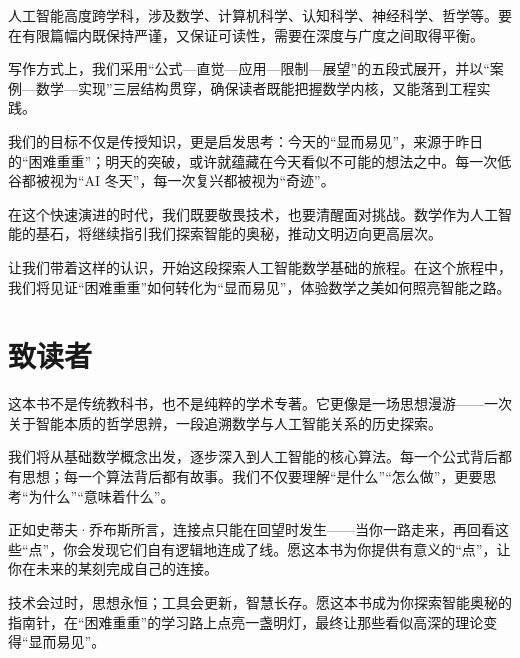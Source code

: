 人工智能高度跨学科，涉及数学、计算机科学、认知科学、神经科学、哲学等。要在有限篇幅内既保持严谨，又保证可读性，需要在深度与广度之间取得平衡。

写作方式上，我们采用“公式—直觉—应用—限制—展望”的五段式展开，并以“案例—数学—实现”三层结构贯穿，确保读者既能把握数学内核，又能落到工程实践。

我们的目标不仅是传授知识，更是启发思考：今天的“显而易见”，来源于昨日的“困难重重”；明天的突破，或许就蕴藏在今天看似不可能的想法之中。每一次低谷都被视为“AI 冬天”，每一次复兴都被视为“奇迹”。

在这个快速演进的时代，我们既要敬畏技术，也要清醒面对挑战。数学作为人工智能的基石，将继续指引我们探索智能的奥秘，推动文明迈向更高层次。

让我们带着这样的认识，开始这段探索人工智能数学基础的旅程。在这个旅程中，我们将见证“困难重重”如何转化为“显而易见”，体验数学之美如何照亮智能之路。

\section{致读者}

这本书不是传统教科书，也不是纯粹的学术专著。它更像是一场思想漫游——一次关于智能本质的哲学思辨，一段追溯数学与人工智能关系的历史探索。

我们将从基础数学概念出发，逐步深入到人工智能的核心算法。每一个公式背后都有思想；每一个算法背后都有故事。我们不仅要理解“是什么”“怎么做”，更要思考“为什么”“意味着什么”。

正如史蒂夫·乔布斯所言，连接点只能在回望时发生——当你一路走来，再回看这些“点”，你会发现它们自有逻辑地连成了线。愿这本书为你提供有意义的“点”，让你在未来的某刻完成自己的连接。

技术会过时，思想永恒；工具会更新，智慧长存。愿这本书成为你探索智能奥秘的指南针，在“困难重重”的学习路上点亮一盏明灯，最终让那些看似高深的理论变得“显而易见”。

\newpage